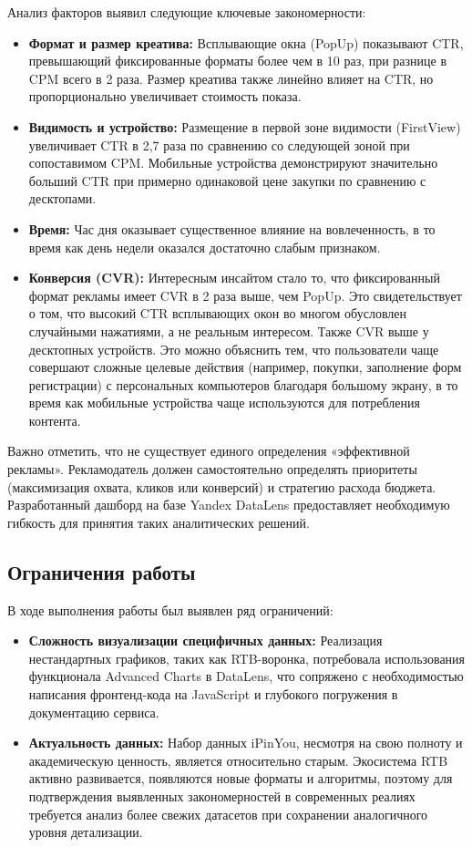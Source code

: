 Анализ факторов выявил следующие ключевые закономерности:
\begin{itemize}
    \item \textbf{Формат и размер креатива:} Всплывающие окна (PopUp) показывают CTR, превышающий фиксированные форматы более чем в 10 раз, при разнице в CPM всего в 2 раза. Размер креатива также линейно влияет на CTR, но пропорционально увеличивает стоимость показа.
    \item \textbf{Видимость и устройство:} Размещение в первой зоне видимости (FirstView) увеличивает CTR в 2,7 раза по сравнению со следующей зоной при сопоставимом CPM. Мобильные устройства демонстрируют значительно больший CTR при примерно одинаковой цене закупки по сравнению с десктопами.
    \item \textbf{Время:} Час дня оказывает существенное влияние на вовлеченность, в то время как день недели оказался достаточно слабым признаком.
    \item \textbf{Конверсия (CVR):} Интересным инсайтом стало то, что фиксированный формат рекламы имеет CVR в 2 раза выше, чем PopUp. Это свидетельствует о том, что высокий CTR всплывающих окон во многом обусловлен случайными нажатиями, а не реальным интересом. Также CVR выше у десктопных устройств. Это можно объяснить тем, что пользователи чаще совершают сложные целевые действия (например, покупки, заполнение форм регистрации) с персональных компьютеров благодаря большому экрану, в то время как мобильные устройства чаще используются для потребления контента.
\end{itemize}

Важно отметить, что не существует единого определения «эффективной рекламы». Рекламодатель должен самостоятельно определять приоритеты (максимизация охвата, кликов или конверсий) и стратегию расхода бюджета. Разработанный дашборд на базе Yandex DataLens предоставляет необходимую гибкость для принятия таких аналитических решений.

\subsection{Ограничения работы}

В ходе выполнения работы был выявлен ряд ограничений:
\begin{itemize}
    \item \textbf{Сложность визуализации специфичных данных:} Реализация нестандартных графиков, таких как RTB-воронка, потребовала использования функционала Advanced Charts в DataLens, что сопряжено с необходимостью написания фронтенд-кода на JavaScript и глубокого погружения в документацию сервиса.
    \item \textbf{Актуальность данных:} Набор данных iPinYou, несмотря на свою полноту и академическую ценность, является относительно старым. Экосистема RTB активно развивается, появляются новые форматы и алгоритмы, поэтому для подтверждения выявленных закономерностей в современных реалиях требуется анализ более свежих датасетов при сохранении аналогичного уровня детализации.
\end{itemize}

